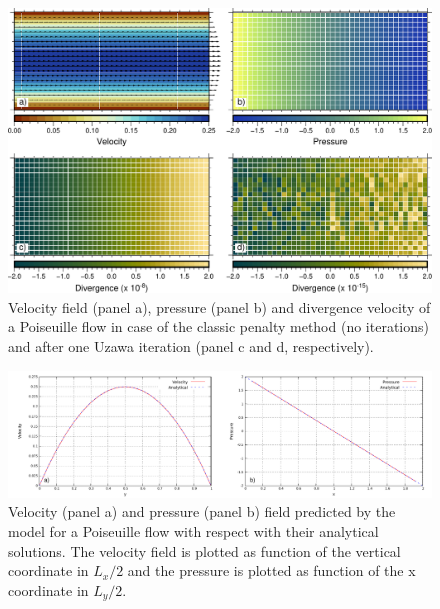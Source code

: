 \documentclass[hidelinks,10pt,a4paper]{article}
\begin{document}
\begin{figure}
\noindent\includegraphics[width=\textwidth]{./Figures/Poiseuille.pdf}
\caption{Velocity field (panel a), pressure (panel b) and divergence velocity of a Poiseuille flow in case of the classic penalty method (no iterations) and
after one Uzawa iteration (panel c and d, respectively).}
\label{fig:poiseuille}
\end{figure}

\begin{figure}
\noindent\includegraphics[width=\textwidth]{./Figures/Analytical.pdf}
\caption{Velocity (panel a) and pressure (panel b) field predicted by the model for a Poiseuille flow with respect with their analytical solutions. The
velocity field is plotted as function of the vertical coordinate in $L_x/2$ and the pressure is plotted as function of the x coordinate in $L_y/2$.}
\label{fig:poi_plot}
\end{figure}
\end{document}
